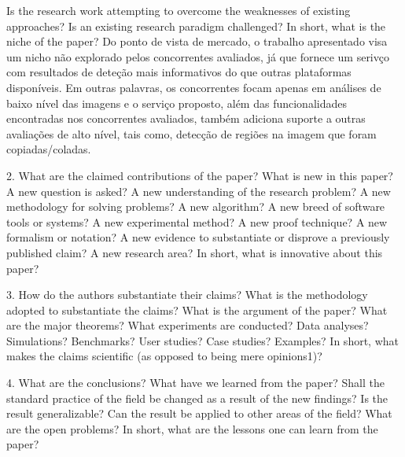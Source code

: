 Is the research work attempting to overcome the weaknesses of existing approaches?
Is an existing research paradigm challenged? In short, what is the niche of the paper?
Do ponto de vista de mercado, o trabalho apresentado visa um nicho não explorado pelos concorrentes
avaliados, já que fornece um serivço com resultados de deteção mais informativos do que outras plataformas disponíveis.
Em outras palavras, os concorrentes focam apenas em análises de baixo nível das imagens e o serviço proposto,
além das funcionalidades encontradas nos concorrentes avaliados, também adiciona suporte a outras avaliações de
alto nível, tais como, detecção de regiões na imagem que foram copiadas/coladas.


2. What are the claimed contributions of the paper? What is new in this paper?
A new question is asked?
A new understanding of the research problem?
A new methodology for solving problems?
A new algorithm?
A new breed of software tools or systems?
A new experimental method?
A new proof technique?
A new formalism or notation?
A new evidence to substantiate or disprove a previously published claim?
A new research area?
In short, what is innovative about this paper?

3. How do the authors substantiate their claims?
What is the methodology adopted to substantiate the claims?
What is the argument of the paper? What are the major theorems?
What experiments are conducted?
Data analyses?
Simulations?
Benchmarks?
User studies?
Case studies?
Examples?
In short, what makes the claims scientific (as opposed to being mere opinions1)?

4. What are the conclusions?
What have we learned from the paper?
Shall the standard practice of the field be changed as a result of the new findings?
Is the result generalizable?
Can the result be applied to other areas of the field?
What are the open problems?
In short, what are the lessons one can learn from the paper?
